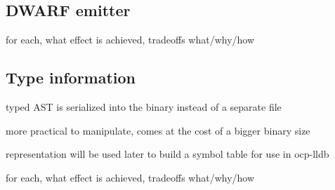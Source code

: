 \subsection{DWARF emitter}

for each, what effect is achieved, tradeoffs
what/why/how

\subsection{Type information}


typed AST is serialized into the binary instead of a separate file

more practical to manipulate, comes at the cost of a bigger binary size

representation will be used later to build a symbol table for use in ocp-lldb


for each, what effect is achieved, tradeoffs
what/why/how

